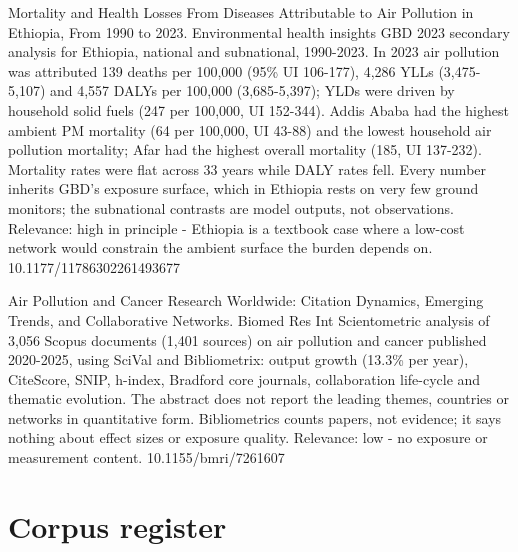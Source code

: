 \documentclass[10pt]{article}
\begin{document}
\par{}\baselineskip{}\baselineskip
{}

{Mortality and Health Losses From Diseases Attributable to Air Pollution in Ethiopia, From 1990 to 2023.}
{Environmental health insights}
{GBD 2023 secondary analysis for Ethiopia, national and subnational, 1990-2023. In 2023 air pollution was attributed 139 deaths per 100,000 (95\% UI 106-177), 4,286 YLLs (3,475-5,107) and 4,557 DALYs per 100,000 (3,685-5,397); YLDs were driven by household solid fuels (247 per 100,000, UI 152-344). Addis Ababa had the highest ambient PM mortality (64 per 100,000, UI 43-88) and the lowest household air pollution mortality; Afar had the highest overall mortality (185, UI 137-232). Mortality rates were flat across 33 years while DALY rates fell. Every number inherits GBD's exposure surface, which in Ethiopia rests on very few ground monitors; the subnational contrasts are model outputs, not observations. Relevance: high in principle - Ethiopia is a textbook case where a low-cost network would constrain the ambient surface the burden depends on.}
{10.1177/11786302261493677}

{Air Pollution and Cancer Research Worldwide: Citation Dynamics, Emerging Trends, and Collaborative Networks.}
{Biomed Res Int}
{Scientometric analysis of 3,056 Scopus documents (1,401 sources) on air pollution and cancer published 2020-2025, using SciVal and Bibliometrix: output growth (13.3\% per year), CiteScore, SNIP, h-index, Bradford core journals, collaboration life-cycle and thematic evolution. The abstract does not report the leading themes, countries or networks in quantitative form. Bibliometrics counts papers, not evidence; it says nothing about effect sizes or exposure quality. Relevance: low - no exposure or measurement content.}
{10.1155/bmri/7261607}

\clearpage
\section*{\sffamily\bfseries\color{Deep}Corpus register}
\vspace{-1.5mm}{\color{Amber}\rule{\linewidth}{1.1pt}}\vspace{2.5mm}
\end{document}
